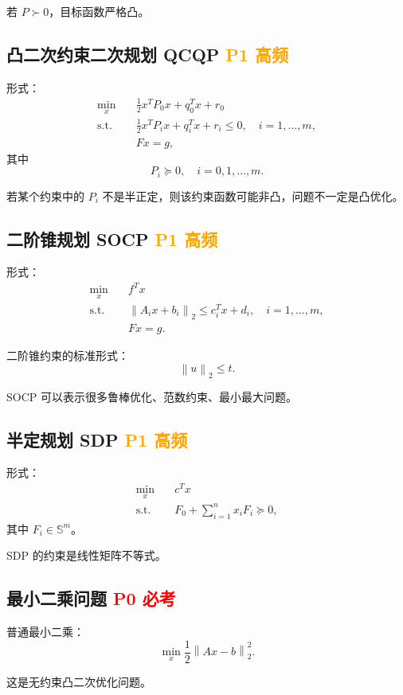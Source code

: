 \documentclass[11pt,a4paper]{ctexart}
\newcommand{\Ssym}{\mathbb{S}}
\newcommand{\st}{\text{s.t.}}
\newcommand{\norm}[1]{\left\lVert #1 \right\rVert}
\newcommand{\Pzero}{\textcolor{red}{\textbf{P0 必考}}}
\newcommand{\Pone}{\textcolor{orange}{\textbf{P1 高频}}}
\theoremstyle{definition}
\theoremstyle{plain}
\theoremstyle{remark}
\begin{document}
若 $P\succ0$，目标函数严格凸。

\subsection{凸二次约束二次规划 QCQP \Pone}

形式：
\[
\begin{aligned}
    \min_x\quad &
    \frac12 x^TP_0x+q_0^Tx+r_0\\
    \st\quad &
    \frac12 x^TP_ix+q_i^Tx+r_i\le0,\quad i=1,\dots,m,\\
    & Fx=g,
\end{aligned}
\]
其中
\[
    P_i\succeq0,\quad i=0,1,\dots,m.
\]

若某个约束中的 $P_i$ 不是半正定，则该约束函数可能非凸，问题不一定是凸优化。

\subsection{二阶锥规划 SOCP \Pone}

形式：
\[
\begin{aligned}
    \min_x\quad & f^Tx\\
    \st\quad &
    \norm{A_i x+b_i}_2
    \le
    c_i^Tx+d_i,
    \quad i=1,\dots,m,\\
    & Fx=g.
\end{aligned}
\]

二阶锥约束的标准形式：
\[
    \norm{u}_2\le t.
\]

SOCP 可以表示很多鲁棒优化、范数约束、最小最大问题。

\subsection{半定规划 SDP \Pone}

形式：
\[
\begin{aligned}
    \min_x\quad & c^Tx\\
    \st\quad &
    F_0+\sum_{i=1}^n x_iF_i\succeq0,
\end{aligned}
\]
其中 $F_i\in\Ssym^m$。

SDP 的约束是线性矩阵不等式。

\subsection{最小二乘问题 \Pzero}

普通最小二乘：
\[
    \min_x \frac12\norm{Ax-b}_2^2.
\]

这是无约束凸二次优化问题。
\end{document}
